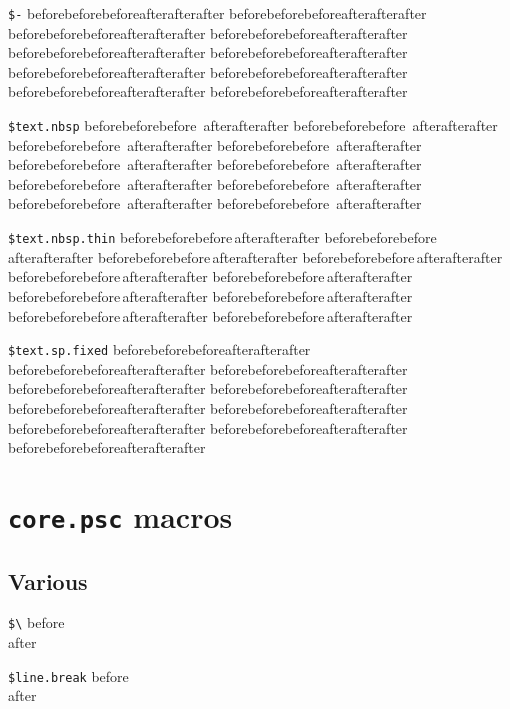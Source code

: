 \documentclass[demo]{pyscribe}
\begin{document}
\par\medskip
\texttt{\$-} beforebeforebefore\-afterafterafter beforebeforebefore\-afterafterafter beforebeforebefore\-afterafterafter beforebeforebefore\-afterafterafter beforebeforebefore\-afterafterafter beforebeforebefore\-afterafterafter beforebeforebefore\-afterafterafter beforebeforebefore\-afterafterafter beforebeforebefore\-afterafterafter beforebeforebefore\-afterafterafter 
\par\medskip
\texttt{\$text.nbsp} beforebeforebefore~afterafterafter beforebeforebefore~afterafterafter beforebeforebefore~afterafterafter beforebeforebefore~afterafterafter beforebeforebefore~afterafterafter beforebeforebefore~afterafterafter beforebeforebefore~afterafterafter beforebeforebefore~afterafterafter beforebeforebefore~afterafterafter beforebeforebefore~afterafterafter 
\par\medskip
\texttt{\$text.nbsp.thin} beforebeforebefore\,afterafterafter beforebeforebefore\,afterafterafter beforebeforebefore\,afterafterafter beforebeforebefore\,afterafterafter beforebeforebefore\,afterafterafter beforebeforebefore\,afterafterafter beforebeforebefore\,afterafterafter beforebeforebefore\,afterafterafter beforebeforebefore\,afterafterafter beforebeforebefore\,afterafterafter 
\par\medskip
\texttt{\$text.sp.fixed} beforebeforebefore\textspfixed afterafterafter beforebeforebefore\textspfixed afterafterafter beforebeforebefore\textspfixed afterafterafter beforebeforebefore\textspfixed afterafterafter beforebeforebefore\textspfixed afterafterafter beforebeforebefore\textspfixed afterafterafter beforebeforebefore\textspfixed afterafterafter beforebeforebefore\textspfixed afterafterafter beforebeforebefore\textspfixed afterafterafter beforebeforebefore\textspfixed afterafterafter 

\chapter{\texttt{core.psc} macros}

\section{Various}

\par\medskip
\texttt{\$\textbackslash{}} before \\ after
\par\medskip
\texttt{\$line.break} before \\ after
\end{document}
